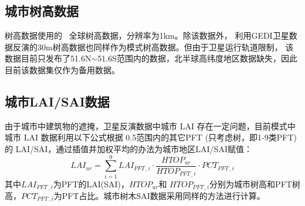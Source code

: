 \subsection{城市树高数据}\label{城市树高数据}
树高数据使用的~\citet{simard2011mapping} 全球树高数据，分辨率为1km。除该数据外， \citet{potapov2021mapping} 
利用GEDI卫星数据反演的30m树高数据也同样作为模式树高数据。但由于卫星运行轨道限制，
该数据目前只发布了51.6\textdegree N$\sim$51.6\textdegree S范围内的数据，北半球高纬度地区数据缺失，因此目前该数据集仅作为备用数据。

\subsection{城市LAI/SAI数据}\label{城市LAISAI数据}
由于城市中建筑物的遮掩，卫星反演数据中城市 LAI 存在一定问题，目前模式中城市 LAI 数据利用以下公式根据 0.5\textdegree 范围内的其它PFT (只考虑树，即1-9类PFT)的 LAI/SAI，通过插值并加权平均的办法为城市地区LAI/SAI赋值：
\begin{equation}
L A I_{u r}=\sum_{i=1}^{9} L A I_{P F T_{-} i} \cdot \frac{H T O P_{u r}}{H T O P_{P F T_{-} i}} \cdot P C T_{P F T_{-} i}
\end{equation}
其中$LAI_{PFT_{-}i}$为PFT的LAI(SAI)，$HTOP_{ur}$和 $HTOP_{PFT_{-} i}$分别为城市树高和PFT树高，$PCT_{PFT_{-} i}$为PFT占比。城市树木SAI数据采用同样的方法进行计算。


